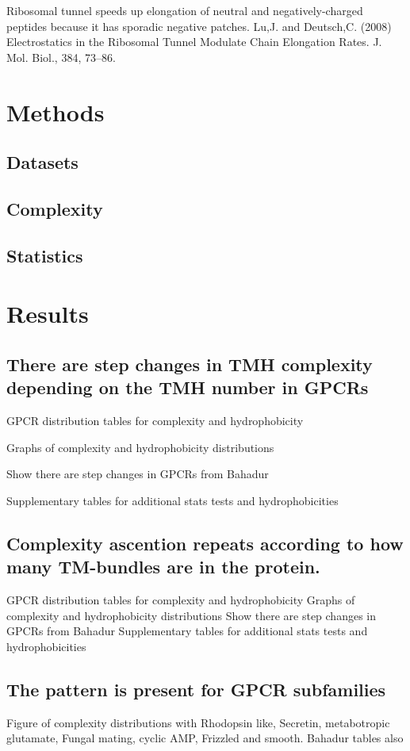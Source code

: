 Ribosomal tunnel speeds up elongation of neutral and negatively-charged peptides because it has sporadic negative patches. Lu,J. and Deutsch,C. (2008) Electrostatics in the Ribosomal Tunnel Modulate Chain Elongation Rates. J. Mol. Biol., 384, 73–86.

\section{Methods}
\subsection{Datasets}
\subsection{Complexity}
\subsection{Statistics}

\section{Results}
\subsection{There are step changes in TMH complexity depending on the TMH number in GPCRs}
GPCR distribution tables for complexity and hydrophobicity

Graphs of complexity and hydrophobicity distributions

Show there are step changes in GPCRs from Bahadur

Supplementary tables for additional stats tests and hydrophobicities

\subsection{Complexity ascention repeats according to how many TM-bundles are in the protein.}
GPCR distribution tables for complexity and hydrophobicity
Graphs of complexity and hydrophobicity distributions
Show there are step changes in GPCRs from Bahadur
Supplementary tables for additional stats tests and hydrophobicities

\subsection{The pattern is present for GPCR subfamilies}
Figure of complexity distributions with Rhodopsin like, Secretin, metabotropic glutamate, Fungal mating, cyclic AMP, Frizzled and smooth.
Bahadur tables also

